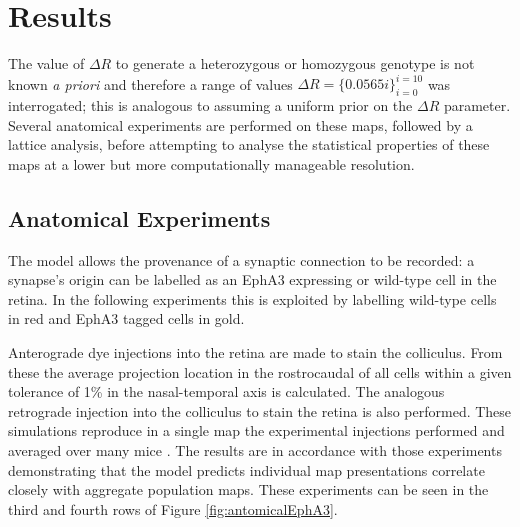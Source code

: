 \section{Results}
The value of $\Delta R$ to generate a heterozygous or homozygous genotype is not known \textit{a priori} and therefore a range of values $\Delta R = \{0.0565 i\}_{i=0}^{i=10}$ was interrogated; this is analogous to assuming a uniform prior on the $\Delta R$ parameter. Several anatomical experiments are performed on these maps, followed by a lattice analysis, before attempting to analyse the statistical properties of these maps at a lower but more computationally manageable resolution.
\subsection{Anatomical Experiments}
The model allows the provenance of a synaptic connection to be recorded: a synapse's origin can be labelled as an EphA3 expressing or wild-type cell in the retina. In the following experiments this is exploited by labelling wild-type cells in red and EphA3 tagged cells in gold. 

Anterograde dye injections into the retina are made to stain the colliculus. From these the average projection location in the rostrocaudal of all cells within a given tolerance of 1\% in the nasal-temporal axis is calculated. The analogous retrograde injection into the colliculus to stain the retina is also performed. These simulations reproduce in a single map the experimental injections performed and averaged over many mice \cite{Brown2000-da}. The results are in accordance with those experiments demonstrating that the model predicts individual map presentations correlate closely with aggregate population maps. These experiments can be seen in the third and fourth rows of Figure \ref{fig:antomicalEphA3}.

